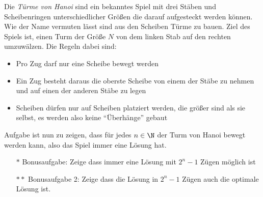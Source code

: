 \begin{exercise}
  Die \emph{Türme von Hanoi} sind ein bekanntes Spiel mit drei Stäben und
  Scheibenringen unterschiedlicher Größen die darauf aufgesteckt werden können.
  Wie der Name vermuten lässt sind aus den Scheiben Türme zu bauen. Ziel des
  Spiels ist, einen Turm der Größe $N$ von dem linken Stab auf den rechten
  umzuwälzen. Die Regeln dabei sind:
  \begin{itemize}
  \item Pro Zug darf nur eine Scheibe bewegt werden
  \item Ein Zug besteht daraus die oberste Scheibe von einem der Stäbe zu nehmen
    und auf einen der anderen Stäbe zu legen
  \item Scheiben dürfen nur auf Scheiben platziert werden, die größer sind als
    sie selbst, es werden also keine \enquote{Überhänge} gebaut
  \end{itemize}
  Aufgabe ist nun zu zeigen, dass für jedes $n \in \N$ der Turm von Hanoi bewegt
  werden kann, also das Spiel immer eine Lösung hat.
  \begin{itemize}
  \item[$\ast$] Bonusaufgabe: Zeige dass immer eine Lösung mit $2^n - 1$ Zügen
    möglich ist
  \item[$\ast\ast$] Bonusaufgabe 2: Zeige dass die Lösung in $2^n - 1$ Zügen auch
    die optimale Lösung ist.
  \end{itemize}
\end{exercise}
